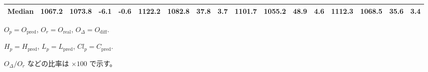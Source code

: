 \begin{threeparttable}
{\begin{tabular}{lrrrrrrrrrrrrrrrr}
 Median & 1067.2 & 1073.8 &       -6.1 &           -0.6 & 1122.2 & 1082.8 &       37.8 &            3.7 & 1101.7 & 1055.2 &       48.9 &            4.6 & 1112.3 & 1068.5 &        35.6 &              3.4 \\
\bottomrule
\end{tabular}
}
\begin{tablenotes}\footnotesize
\item $O_p=O_{\text{pred}}$, $O_r=O_{\text{real}}$, $O_\Delta=O_{\text{diff}}$.
\item $H_p=H_{\text{pred}}$, $L_p=L_{\text{pred}}$, $Cl_p=C_{\text{pred}}$.
\item $O_\Delta/O_r$ などの比率は \(\times100\) で示す。
\end{tablenotes}
\end{threeparttable}
\endgroup
